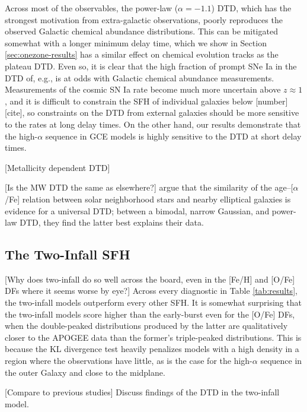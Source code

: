 \documentclass[twocolumn,twocolappendix,linenumbers,trackchanges]{aastex631}
\begin{document}
Across most of the observables, the power-law ($\alpha=-1.1$) DTD, which has the strongest motivation from extra-galactic observations, poorly reproduces the observed Galactic chemical abundance distributions. This can be mitigated somewhat with a longer minimum delay time, which we show in Section \ref{sec:onezone-results} has a similar effect on chemical evolution tracks as the plateau DTD. Even so, it is clear that the high fraction of prompt SNe Ia in the DTD of, e.g., \citet{Maoz2017-CosmicDTD} is at odds with Galactic chemical abundance measurements. 
Measurements of the cosmic SN Ia rate become much more uncertain above $z\approx1$, and it is difficult to constrain the SFH of individual galaxies below [number] [cite], so constraints on the DTD from external galaxies should be more sensitive to the rates at long delay times. On the other hand, our results demonstrate that the high-$\alpha$ sequence in GCE models is highly sensitive to the DTD at short delay times.

[Metallicity dependent DTD] \citet{Gandhi2022-MetallicityDependentRates,Johnson2023-Binaries}

[Is the MW DTD the same as elsewhere?]
\citet{Walcher2016-SelfSimilarity} argue that the similarity of the age--[$\alpha$/Fe] relation between solar neighborhood stars and nearby elliptical galaxies is evidence for a universal DTD; between a bimodal, narrow Gaussian, and power-law DTD, they find the latter best explains their data.

\subsection{The Two-Infall SFH}
\label{sec:two-infall-discussion}

[Why does two-infall do so well across the board, even in the [Fe/H] and [O/Fe] DFs where it seems worse by eye?]
Across every diagnostic in Table \ref{tab:results}, the two-infall models outperform every other SFH.
It is somewhat surprising that the two-infall models score higher than the early-burst even for the [O/Fe] DFs, when the double-peaked distributions produced by the latter are qualitatively closer to the APOGEE data than the former's triple-peaked distributions. This is because the KL divergence test heavily penalizes models with a high density in a region where the observations have little, as is the case for the high-$\alpha$ sequence in the outer Galaxy and close to the midplane. 

[Compare to previous studies]
Discuss \citet{Matteucci2006-BimodalDTDConsequences} findings of the \citet{Mannucci2006-TwoPopulations} DTD in the two-infall model.
\end{document}
